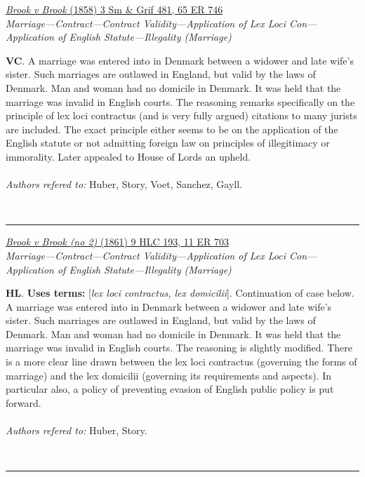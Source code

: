 \documentclass[twoside]{article}
\begin{document}
        \begin{small}
        \begin{center}
        \href{https://heinonline.org/HOL/Page?lname=&public=false&collection=engrep&handle=hein.engrep/engre0065&men_hide=false&men_tab=toc&kind=&page=746}{\textit{Brook v Brook} (1858) 3 Sm \& Grif 481, 65 ER 746} \label{105} \\ 
\textit{Marriage---Contract---Contract Validity---Application of Lex Loci Con---Application of English Statute---Illegality (Marriage)}\\
        \end{center}
        \textbf{VC}. A marriage was entered into in Denmark between a widower and late wife’s sister. Such marriages are outlawed in England, but valid by the laws of Denmark. Man and woman had no domicile in Denmark. It was held that the marriage was invalid in English courts. The reasoning remarks specifically on the principle of lex loci contractus (and is very fully argued) citations to many jurists are included. The exact principle either seems to be on the application of the English statute or not admitting foreign law on principles of illegitimacy or immorality. Later appealed to House of Lords an upheld.\\\\\textit{Authors refered to: }Huber, Story, Voet, Sanchez, Gayll.
        \end{small}\\
        \rule{\textwidth}{0.5pt}
        

        \begin{small}
        \begin{center}
        \href{https://heinonline.org/HOL/P?h=hein.engrep/engra0011&i=713}{\textit{Brook v Brook (no 2)} (1861) 9 HLC 193, 11 ER 703} \label{115} \\ 
\textit{Marriage---Contract---Contract Validity---Application of Lex Loci Con---Application of English Statute---Illegality (Marriage)}\\
        \end{center}
        \textbf{HL}.  \textbf{Uses terms: }[\textit{lex loci contractus, lex domicilii}]. Continuation of case below. A marriage was entered into in Denmark between a widower and late wife’s sister. Such marriages are outlawed in England, but valid by the laws of Denmark. Man and woman had no domicile in Denmark. It was held that the marriage was invalid in English courts. The reasoning is slightly modified. There is a more clear line drawn between the lex loci contractus (governing the forms of marriage) and the lex domicilii (governing its requirements and aspects). In particular also, a policy of preventing evasion of English public policy is put forward.\\\\\textit{Authors refered to: }Huber, Story.
        \end{small}\\
        \rule{\textwidth}{0.5pt}
        
\end{document}
